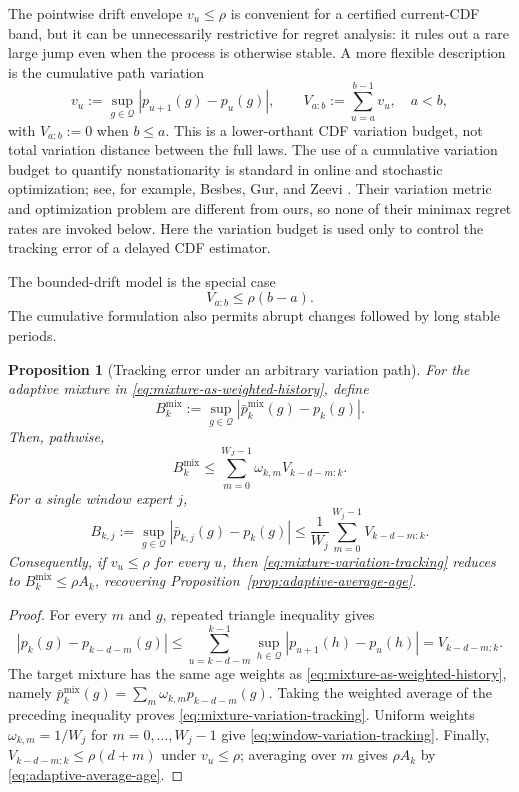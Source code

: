 \documentclass[11pt]{article}
\newtheorem{proposition}[theorem]{Proposition}
\newcommand{\Q}{\mathcal{Q}}
\newcommand{\1}{\mathbf{1}}
\begin{document}
The pointwise drift envelope $v_u\le\rho$ is convenient for a certified
current-CDF band, but it can be unnecessarily restrictive for regret analysis:
it rules out a rare large jump even when the process is otherwise stable.  A
more flexible description is the cumulative path variation
\begin{equation}
    v_u
    :=
    \sup_{g\in\Q}|p_{u+1}(g)-p_u(g)|,
    \qquad
    V_{a:b}
    :=
    \sum_{u=a}^{b-1} v_u,
    \quad a<b,
    \label{eq:path-variation}
\end{equation}
with $V_{a:b}:=0$ when $b\le a$.  This is a lower-orthant CDF variation
budget, not total variation distance between the full laws.  The use of a
cumulative variation budget to quantify nonstationarity is standard in online
and stochastic optimization; see, for example, Besbes, Gur, and Zeevi
\cite{besbes2015}.  Their variation metric and optimization problem are
different from ours, so none of their minimax regret rates are invoked below.
Here the variation budget is used only to control the tracking error of a
delayed CDF estimator.

The bounded-drift model is the special case
\[
    V_{a:b}\le \rho(b-a).
\]
The cumulative formulation also permits abrupt changes followed by long stable
periods.

\begin{proposition}[Tracking error under an arbitrary variation path]
\label{prop:mixture-variation-path}
For the adaptive mixture in \eqref{eq:mixture-as-weighted-history}, define
\[
    B_k^{\mathrm{mix}}
    :=
    \sup_{g\in\Q}
    |\bar p_k^{\mathrm{mix}}(g)-p_k(g)|.
\]
Then, pathwise,
\begin{equation}
\boxed{
    B_k^{\mathrm{mix}}
    \le
    \sum_{m=0}^{W_J-1}
    \omega_{k,m}
    V_{k-d-m:k}.
}
\label{eq:mixture-variation-tracking}
\end{equation}
For a single window expert $j$,
\begin{equation}
    B_{k,j}
    :=
    \sup_{g\in\Q}
    |\bar p_{k,j}(g)-p_k(g)|
    \le
    \frac1{W_j}
    \sum_{m=0}^{W_j-1}
    V_{k-d-m:k}.
    \label{eq:window-variation-tracking}
\end{equation}
Consequently, if $v_u\le\rho$ for every $u$, then
\eqref{eq:mixture-variation-tracking} reduces to
$B_k^{\mathrm{mix}}\le\rho A_k$, recovering
Proposition~\ref{prop:adaptive-average-age}.
\end{proposition}

\begin{proof}
For every $m$ and $g$, repeated triangle inequality gives
\[
    |p_k(g)-p_{k-d-m}(g)|
    \le
    \sum_{u=k-d-m}^{k-1}
    \sup_{h\in\Q}|p_{u+1}(h)-p_u(h)|
    =
    V_{k-d-m:k}.
\]
The target mixture has the same age weights as
\eqref{eq:mixture-as-weighted-history}, namely
$\bar p_k^{\mathrm{mix}}(g)=\sum_m\omega_{k,m}p_{k-d-m}(g)$.
Taking the weighted average of the preceding inequality proves
\eqref{eq:mixture-variation-tracking}.  Uniform weights
$\omega_{k,m}=1/W_j$ for $m=0,\ldots,W_j-1$ give
\eqref{eq:window-variation-tracking}.  Finally,
$V_{k-d-m:k}\le\rho(d+m)$ under $v_u\le\rho$; averaging over $m$ gives
$\rho A_k$ by \eqref{eq:adaptive-average-age}.
\end{proof}
\end{document}
